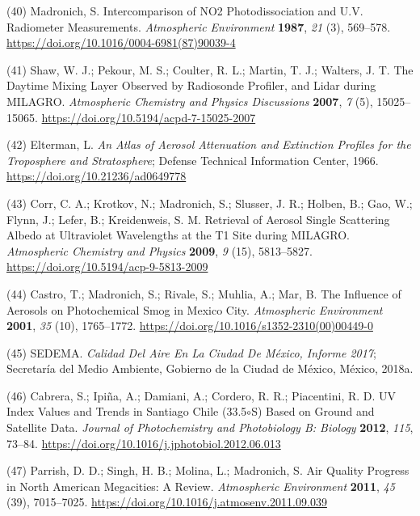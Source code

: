 \documentclass[10pt]{article}
\begin{document}
\label{csl:40}(40) Madronich, S. {Intercomparison of {NO}2 Photodissociation and U.V. Radiometer Measurements}. \textit{Atmospheric Environment} \textbf{1987}, \textit{21} (3), 569–578. \url{https://doi.org/10.1016/0004-6981(87)90039-4}

\label{csl:41}(41) Shaw, W. J.; Pekour, M. S.; Coulter, R. L.; Martin, T. J.; Walters, J. T. {The Daytime Mixing Layer Observed by Radiosonde Profiler, and Lidar during {MILAGRO}}. \textit{Atmospheric Chemistry and Physics Discussions} \textbf{2007}, \textit{7} (5), 15025–15065. \url{https://doi.org/10.5194/acpd-7-15025-2007}

\label{csl:42}(42) Elterman, L. \textit{{An Atlas of Aerosol Attenuation and Extinction Profiles for the Troposphere and Stratosphere}}; Defense Technical Information Center, 1966. \url{https://doi.org/10.21236/ad0649778}

\label{csl:43}(43) Corr, C. A.; Krotkov, N.; Madronich, S.; Slusser, J. R.; Holben, B.; Gao, W.; Flynn, J.; Lefer, B.; Kreidenweis, S. M. {Retrieval of Aerosol Single Scattering Albedo at Ultraviolet Wavelengths at the T1 Site during {MILAGRO}}. \textit{Atmospheric Chemistry and Physics} \textbf{2009}, \textit{9} (15), 5813–5827. \url{https://doi.org/10.5194/acp-9-5813-2009}

\label{csl:44}(44) Castro, T.; Madronich, S.; Rivale, S.; Muhlia, A.; Mar, B. {The Influence of Aerosols on Photochemical Smog in Mexico City}. \textit{Atmospheric Environment} \textbf{2001}, \textit{35} (10), 1765–1772. \url{https://doi.org/10.1016/s1352-2310(00)00449-0}

\label{csl:45}(45) SEDEMA. \textit{{Calidad Del Aire En La Ciudad De México, Informe 2017}}; Secretaría del Medio Ambiente, Gobierno de la Ciudad de México, México, 2018a.

\label{csl:46}(46) Cabrera, S.; Ipi{\~{n}}a, A.; Damiani, A.; Cordero, R. R.; Piacentini, R. D. {{UV} Index Values and Trends in Santiago Chile (33.5$\circ$S) Based on Ground and Satellite Data}. \textit{Journal of Photochemistry and Photobiology B: Biology} \textbf{2012}, \textit{115}, 73–84. \url{https://doi.org/10.1016/j.jphotobiol.2012.06.013}

\label{csl:47}(47) Parrish, D. D.; Singh, H. B.; Molina, L.; Madronich, S. {Air Quality Progress in North American Megacities: A Review}. \textit{Atmospheric Environment} \textbf{2011}, \textit{45} (39), 7015–7025. \url{https://doi.org/10.1016/j.atmosenv.2011.09.039}
\end{document}
